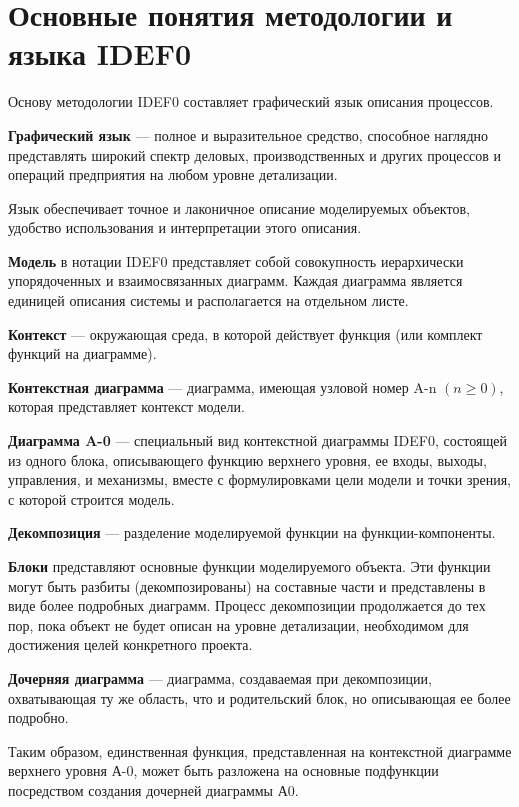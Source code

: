 \documentclass[a4paper, final]{article}
\begin{document}
\newpage
\section{Основные понятия методологии и языка IDEF0}
Основу методологии IDEF0 составляет графический язык описания процессов.

{\bf Графический язык} --- полное и выразительное средство, способное наглядно представлять широкий спектр деловых, 
производственных и других процессов и операций предприятия на любом уровне детализации.

Язык обеспечивает точное и лаконичное описание моделируемых объектов, удобство использования и интерпретации этого описания.

{\bf Модель} в нотации IDEF0 представляет собой совокупность иерархически упорядоченных и взаимосвязанных диаграмм. 
Каждая диаграмма является единицей описания системы и располагается на отдельном листе.

{\bf Контекст} --- окружающая среда, в которой действует функция (или комплект функций на диаграмме).

{\bf Контекстная диаграмма} --- диаграмма, имеющая узловой номер A-n $( n\ge 0 )$, которая представляет контекст модели.

{\bf Диаграмма A-0} --- специальный вид контекстной диаграммы IDEF0, состоящей из одного блока, описывающего функцию 
верхнего уровня, ее входы, выходы, управления, и механизмы, вместе с формулировками цели модели и точки зрения, 
с которой строится модель.

{\bf Декомпозиция} ---  разделение моделируемой функции на функции-компоненты.

{\bf Блоки} представляют основные функции моделируемого объекта. Эти функции могут быть разбиты (декомпозированы) 
на составные части и представлены в виде более подробных диаграмм. Процесс декомпозиции продолжается до тех пор, пока 
объект не будет описан на уровне детализации, необходимом для достижения целей конкретного проекта. 

{\bf Дочерняя диаграмма} --- диаграмма, создаваемая при декомпозиции, охватывающая ту же область, что и родительский блок, 
но описывающая ее более подробно.

Таким образом, единственная функция, представленная на контекстной диаграмме верхнего уровня А-0, 
может быть разложена на основные подфункции посредством создания дочерней диаграммы А0.
\end{document}

